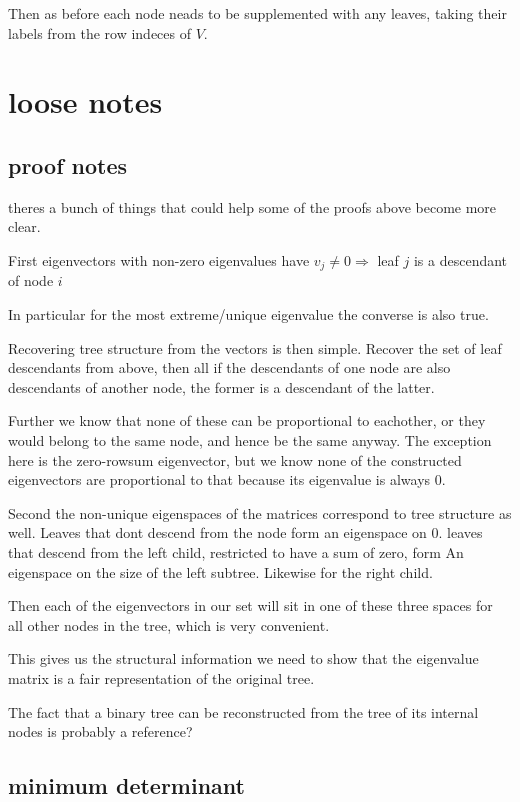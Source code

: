 \documentclass{report}
\begin{document}
Then as before each node neads to be supplemented with any leaves, taking their
labels from the row indeces of $V$.

\section{loose notes}

\subsection{proof notes}

theres a bunch of things that could help some of the proofs above become more
clear.

First eigenvectors with non-zero eigenvalues have $v_{j} \neq 0 \Rightarrow$
leaf $j$ is a descendant of node $i$

In particular for the most extreme/unique eigenvalue the converse is also true.

Recovering tree structure from the vectors is then simple.
Recover the set of leaf descendants from above, then all if the descendants of
one node are also descendants of another node, the former is a descendant of
the latter.

Further we know that none of these can be proportional to eachother, or they
would belong to the same node, and hence be the same anyway.
The exception here is the zero-rowsum eigenvector, but we know none of the
constructed eigenvectors are proportional to that because its eigenvalue is
always 0.

Second the non-unique eigenspaces of the matrices correspond to tree structure
as well.
Leaves that dont descend from the node form an eigenspace on 0.
leaves that descend from the left child, restricted to have a sum of zero, form
An eigenspace on the size of the left subtree.
Likewise for the right child.

Then each of the eigenvectors in our set will sit in one of these three spaces
for all other nodes in the tree, which is very convenient.

This gives us the structural information we need to show that the eigenvalue
matrix is a fair representation of the original tree.

The fact that a binary tree can be reconstructed from the tree of its internal
nodes is probably a reference?

\subsection{minimum determinant}
\end{document}
